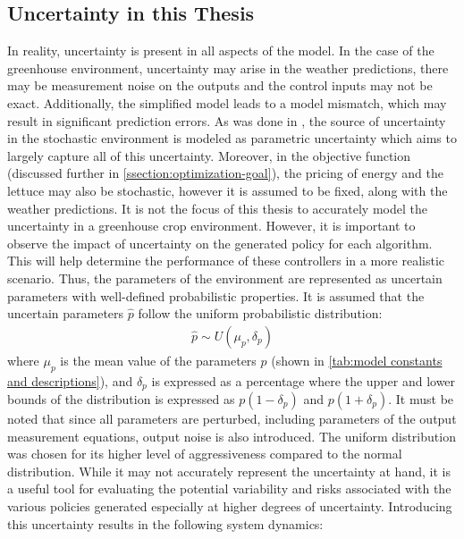 \subsection{Uncertainty in this Thesis}
In reality, uncertainty is present in all aspects of the model. In the case of the greenhouse environment, uncertainty may arise in the weather predictions, there may be measurement noise on the outputs and the control inputs may not be exact. Additionally, the simplified model leads to a model mismatch, which may result in significant prediction errors.  As was done in \cite{boersmaRobustSamplebasedModel2022, lubbersAutonomousGreenhouseClimate2023}, the source of uncertainty in the stochastic environment is modeled as parametric uncertainty which aims to largely capture all of this uncertainty. Moreover, in the objective function (discussed further in \autoref{ssection:optimization-goal}), the pricing of energy and the lettuce may also be stochastic, however it is assumed to be fixed, along with the weather predictions.
It is not the focus of this thesis to accurately model the uncertainty in a greenhouse crop environment. However, it is important to observe the impact of uncertainty on the generated policy for each algorithm. This will help determine the performance of these controllers in a more realistic scenario. Thus, the parameters of the environment are represented as uncertain parameters with well-defined probabilistic properties. It is assumed that the uncertain parameters $\hat{p}$ follow the uniform probabilistic distribution:
\begin{equation}
	\label{eq:uncertainty_model}
	\begin{aligned}
		\hat{p} \sim U(\mu_p, \delta_p)  
	\end{aligned}
\end{equation}
where $\mu_p$ is the mean value of the parameters $p$ (shown in \autoref{tab:model constants and descriptions}), and $\delta_p$ is expressed as a percentage where the upper and lower bounds of the distribution is expressed as $p(1-\delta_p)$ and $p(1+\delta_p)$. It must be noted that since all parameters are perturbed, including parameters of the output measurement equations, output noise is also introduced. The uniform distribution was chosen for its higher level of aggressiveness compared to the normal distribution. While it may not accurately represent the uncertainty at hand, it is a useful tool for evaluating the potential variability and risks associated with the various policies generated especially at higher degrees of uncertainty. Introducing this uncertainty results in the following system dynamics:

